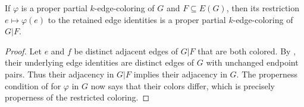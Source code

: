 \begin{lemma}
If $\varphi$ is a proper partial $k$-edge-coloring of $G$ and $F\subseteq
E(G)$, then its restriction $e\mapsto\varphi(e)$ to the retained edge
identities is a proper partial $k$-edge-coloring of $G|F$.
\end{lemma}
\begin{proof}
Let $e$ and $f$ be distinct adjacent edges of $G|F$ that are both colored.
By , their underlying edge identities are distinct
edges of $G$ with unchanged endpoint pairs.  Thus their adjacency in $G|F$
implies their adjacency in $G$.  The properness condition of
 for $\varphi$ in $G$ now says that their
colors differ, which is precisely properness of the restricted coloring.
\end{proof}
